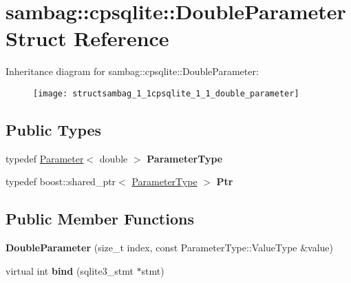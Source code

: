 \hypertarget{structsambag_1_1cpsqlite_1_1_double_parameter}{
\section{sambag::cpsqlite::DoubleParameter Struct Reference}
\label{structsambag_1_1cpsqlite_1_1_double_parameter}
}
Inheritance diagram for sambag::cpsqlite::DoubleParameter:\begin{figure}[H]
\begin{center}
\leavevmode
\texttt{[image: structsambag\_1\_1cpsqlite\_1\_1\_double\_parameter]}
\end{center}
\end{figure}
\subsection*{Public Types}
\begin{DoxyCompactItemize}
\item 
\hypertarget{structsambag_1_1cpsqlite_1_1_double_parameter_abafc755c4e2ec8c1792b323dcb910143}{
typedef \hyperlink{structsambag_1_1cpsqlite_1_1_parameter}{Parameter}$<$ double $>$ {\bfseries ParameterType}}
\label{structsambag_1_1cpsqlite_1_1_double_parameter_abafc755c4e2ec8c1792b323dcb910143}

\item 
\hypertarget{structsambag_1_1cpsqlite_1_1_double_parameter_ac2bc850470a7ab26c7e38c81149328fe}{
typedef boost::shared\_\-ptr$<$ \hyperlink{structsambag_1_1cpsqlite_1_1_parameter}{ParameterType} $>$ {\bfseries Ptr}}
\label{structsambag_1_1cpsqlite_1_1_double_parameter_ac2bc850470a7ab26c7e38c81149328fe}

\end{DoxyCompactItemize}
\subsection*{Public Member Functions}
\begin{DoxyCompactItemize}
\item 
\hypertarget{structsambag_1_1cpsqlite_1_1_double_parameter_a847065451e83e4fde75dd7e64a747416}{
{\bfseries DoubleParameter} (size\_\-t index, const ParameterType::ValueType \&value)}
\label{structsambag_1_1cpsqlite_1_1_double_parameter_a847065451e83e4fde75dd7e64a747416}

\item 
\hypertarget{structsambag_1_1cpsqlite_1_1_double_parameter_aeeda1b8eb3b872d8dd29313a9c015ea1}{
virtual int {\bfseries bind} (sqlite3\_\-stmt $\ast$stmt)}
\label{structsambag_1_1cpsqlite_1_1_double_parameter_aeeda1b8eb3b872d8dd29313a9c015ea1}

\end{DoxyCompactItemize}
